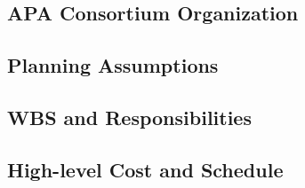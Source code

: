 \subsection{APA Consortium Organization}
\label{sec:fdsp-apa-org-consortium}


\subsection{Planning Assumptions}
\label{sec:fdsp-apa-org-assmp}


\subsection{WBS and Responsibilities}
\label{sec:fdsp-apa-org-wbs}

\subsection{High-level Cost and Schedule}
\label{sec:fdsp-apa-org-cs}

















